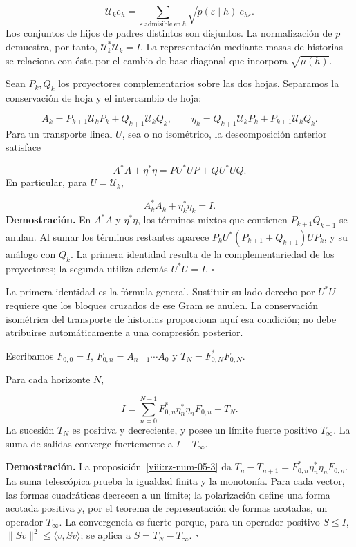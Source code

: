 \[
\mathcal U_ke_h=
\sum_{\varepsilon\ \mathrm{admisible\ en}\ h}
\sqrt{p(\varepsilon\mid h)}\,e_{h\varepsilon}.
\]
Los conjuntos de hijos de padres distintos son disjuntos. La normalización de \(p\) demuestra, por tanto, \(\mathcal U_k^*\mathcal U_k=I\). La representación mediante masas de historias se relaciona con ésta por el cambio de base diagonal que incorpora \(\sqrt{\mu(h)}\).

Sean \(P_k,Q_k\) los proyectores complementarios sobre las dos hojas. Separamos la conservación de hoja y el intercambio de hoja:

\[
A_k=P_{k+1}\mathcal U_kP_k+Q_{k+1}\mathcal U_kQ_k,
\qquad
\eta_k=Q_{k+1}\mathcal U_kP_k+P_{k+1}\mathcal U_kQ_k.
\]
Para un transporte lineal \(U\), sea o no isométrico, la descomposición anterior satisface

\[
A^*A+\eta^*\eta=PU^*UP+QU^*UQ.
\]
En particular, para \(U=\mathcal U_k\),

\[
A_k^*A_k+\eta_k^*\eta_k=I.
\]
\textbf{Demostración.} En \(A^*A\) y \(\eta^*\eta\), los términos mixtos que contienen \(P_{k+1}Q_{k+1}\) se anulan. Al sumar los términos restantes aparece \(P_kU^*(P_{k+1}+Q_{k+1})UP_k\), y su análogo con \(Q_k\). La primera identidad resulta de la complementariedad de los proyectores; la segunda utiliza además \(U^*U=I\). \hfill\(\square\)

La primera identidad es la fórmula general. Sustituir su lado derecho por \(U^*U\) requiere que los bloques cruzados de ese Gram se anulen. La conservación isométrica del transporte de historias proporciona aquí esa condición; no debe atribuirse automáticamente a una compresión posterior.

Escribamos \(F_{0,0}=I\), \(F_{0,n}=A_{n-1}\cdots A_0\) y \(T_N=F_{0,N}^*F_{0,N}\).

Para cada horizonte \(N\),

\[
I=\sum_{n=0}^{N-1}
F_{0,n}^*\eta_n^*\eta_nF_{0,n}+T_N.
\]
La sucesión \(T_N\) es positiva y decreciente, y posee un límite fuerte positivo \(T_\infty\). La suma de salidas converge fuertemente a \(I-T_\infty\).

\textbf{Demostración.} La proposición~\ref{viii:rz-num-05-3} da \(T_n-T_{n+1}=F_{0,n}^*\eta_n^*\eta_nF_{0,n}\). La suma telescópica prueba la igualdad finita y la monotonía. Para cada vector, las formas cuadráticas decrecen a un límite; la polarización define una forma acotada positiva y, por el teorema de representación de formas acotadas, un operador \(T_\infty\). La convergencia es fuerte porque, para un operador positivo \(S\leq I\), \(\|Sv\|^2\leq\langle v,Sv\rangle\); se aplica a \(S=T_N-T_\infty\). \hfill\(\square\)

